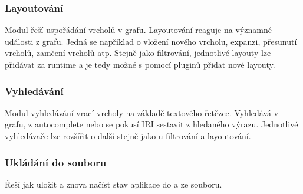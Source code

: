 \subsubsection{Layoutování}
Modul řeší uspořádání vrcholů v grafu. Layoutování reaguje na významné události z grafu. Jedná se například o vložení nového vrcholu, expanzi, přesunutí vrcholů, zamčení vrcholů atp. Stejně jako filtrování, jednotlivé layouty lze přidávat za runtime a je tedy možné s pomocí pluginů přidat nové layouty.

\subsubsection{Vyhledávání}
Modul vyhledávání vrací vrcholy na základě textového řetězce. Vyhledává v grafu, z autocomplete nebo se pokusí IRI sestavit z hledaného výrazu. Jednotlivé vyhledávače lze rozšířit o další stejně jako u filtrování a layoutování.

\subsubsection{Ukládání do souboru}
Řeší jak uložit a znova načíst stav aplikace do a ze souboru.
